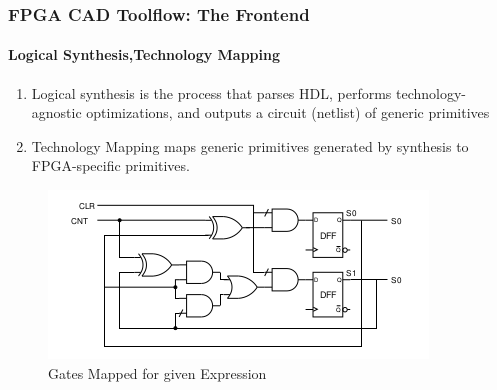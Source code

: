 \documentclass{beamer}
\begin{document}
\begin{frame}[fragile]
    \frametitle{FPGA CAD Toolflow: The Frontend}
    \framesubtitle{Logical Synthesis,Technology Mapping}
    \begin{enumerate}
      \item Logical synthesis is the process that parses HDL, performs
        technology-agnostic optimizations, and outputs a circuit (netlist)
        of generic primitives
      \item Technology Mapping maps generic primitives generated by synthesis to
        FPGA-specific primitives. 
    \end{enumerate}
    \begin{figure}
        \includegraphics[width=0.5\linewidth]{images/netlist_gate.png}
        \caption{Gates Mapped for given Expression}
        \label{exa_mapgate}
    \end{figure}

\end{frame}
\end{document}
